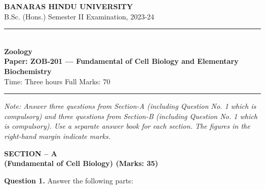 \documentclass[11pt,a4paper]{article}
\begin{document}
\begin{center}
  {\large\bfseries BANARAS HINDU UNIVERSITY}\\[2pt]
  {\normalsize B.Sc. (Hons.) Semester II Examination, 2023-24}\\[6pt]
  \rule{0.8\linewidth}{0.5pt}\\[6pt]
  {\large\bfseries Zoology}\\[4pt]
  {\large\bfseries Paper: ZOB-201 --- Fundamental of Cell Biology and Elementary Biochemistry}\\[4pt]
  {\normalsize Time: Three hours \hfill Full Marks: 70}
\end{center}

\rule{\linewidth}{0.4pt}

\smallskip



\noindent   \textit{Note: Answer three questions from Section-A (including Question No. 1 which is compulsory) and three questions from Section-B (including Question No. 1 which is compulsory). Use a separate answer book for each section. The figures in the right-hand margin indicate marks.}

\bigskip

\begin{center}
   \textbf{SECTION -- A} \\
   \textbf{(Fundamental of Cell Biology) (Marks: 35)}
\end{center}




\noindent   \textbf{Question 1.} Answer the following parts:
\end{document}
